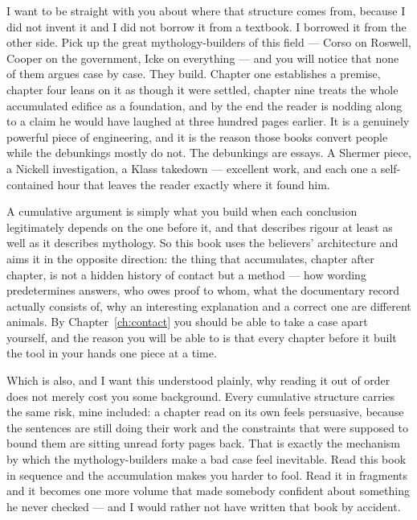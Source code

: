 I want to be straight with you about where that structure comes from, because I
did not invent it and I did not borrow it from a textbook. I borrowed it from
the other side. Pick up the great mythology-builders of this field --- Corso on
Roswell, Cooper on the government, Icke on everything --- and you will notice
that none of them argues case by case. They build. Chapter one establishes a
premise, chapter four leans on it as though it were settled, chapter nine treats
the whole accumulated edifice as a foundation, and by the end the reader is
nodding along to a claim he would have laughed at three hundred pages earlier.
It is a genuinely powerful piece of engineering, and it is the reason those books
convert people while the debunkings mostly do not. The debunkings are essays. A
Shermer piece, a Nickell investigation, a Klass takedown --- excellent work, and
each one a self-contained hour that leaves the reader exactly where it found
him.


A cumulative argument is simply what you build when each conclusion
legitimately depends on the one before it, and that describes rigour at least as
well as it describes mythology. So this book uses the believers' architecture and
aims it in the opposite direction: the thing that accumulates, chapter after
chapter, is not a hidden history of contact but a method --- how wording
predetermines answers, who owes proof to whom, what the documentary record
actually consists of, why an interesting explanation and a correct one are
different animals. By Chapter~\ref{ch:contact} you should be able to take a case
apart yourself, and the reason you will be able to is that every chapter before it
built the tool in your hands one piece at a time.

Which is also, and I want this understood plainly, why reading it out of order
does not merely cost you some background.  Every
cumulative structure carries the same risk, mine included: a chapter read on its
own feels persuasive, because the sentences are still doing their work and the
constraints that were supposed to bound them are sitting unread forty pages back.
That is exactly the mechanism by which the mythology-builders make a bad case
feel inevitable. Read this book in sequence and the accumulation makes you
harder to fool. Read it in fragments and it becomes one more volume that made
somebody confident about something he never checked --- and I would rather not
have written that book by accident.

